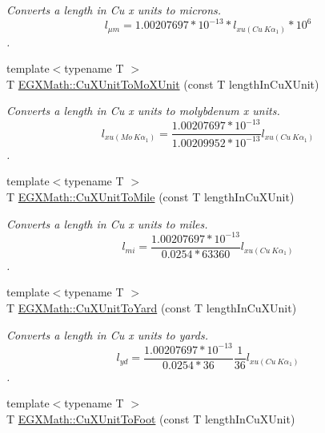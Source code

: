 \begin{DoxyCompactItemize}
\begin{DoxyCompactList}\small\item\em Converts a length in Cu x units to microns. \[ l_{\mu m}=1.00207697*10^{-13} * l_{xu(Cu\ K\alpha_1)} * 10^{6} \]. \end{DoxyCompactList}\item 
{\footnotesize template$<$typename T $>$ }\\T \mbox{\hyperlink{group___e_g_x_math-_conversions-_length_conversions-_non-_s_i-_cu_x_unit-_non-_s_i_gad93f4b59cc8e8f052b3cf8cad7c7b173}{E\+G\+X\+Math\+::\+Cu\+X\+Unit\+To\+Mo\+X\+Unit}} (const T length\+In\+Cu\+X\+Unit)
\begin{DoxyCompactList}\small\item\em Converts a length in Cu x units to molybdenum x units. \[ l_{xu(Mo\ K\alpha_1)}=\frac{1.00207697*10^{-13}}{1.00209952*10^{-13}} l_{xu(Cu\ K\alpha_1)}\]. \end{DoxyCompactList}\item 
{\footnotesize template$<$typename T $>$ }\\T \mbox{\hyperlink{group___e_g_x_math-_conversions-_length_conversions-_non-_s_i-_cu_x_unit-_imperial_gaa1fe76010dc4559641c3bd31bd0f2c3e}{E\+G\+X\+Math\+::\+Cu\+X\+Unit\+To\+Mile}} (const T length\+In\+Cu\+X\+Unit)
\begin{DoxyCompactList}\small\item\em Converts a length in Cu x units to miles. \[ l_{mi}=\frac{1.00207697*10^{-13}}{0.0254 * 63360} l_{xu(Cu\ K\alpha_1)} \]. \end{DoxyCompactList}\item 
{\footnotesize template$<$typename T $>$ }\\T \mbox{\hyperlink{group___e_g_x_math-_conversions-_length_conversions-_non-_s_i-_cu_x_unit-_imperial_ga9f1d992d0b4ec16bf1d10bd0b0d96f96}{E\+G\+X\+Math\+::\+Cu\+X\+Unit\+To\+Yard}} (const T length\+In\+Cu\+X\+Unit)
\begin{DoxyCompactList}\small\item\em Converts a length in Cu x units to yards. \[ l_{yd}= \frac{1.00207697*10^{-13}}{0.0254 * 36} \frac{1}{36} l_{xu(Cu\ K\alpha_1)} \]. \end{DoxyCompactList}\item 
{\footnotesize template$<$typename T $>$ }\\T \mbox{\hyperlink{group___e_g_x_math-_conversions-_length_conversions-_non-_s_i-_cu_x_unit-_imperial_ga715aad2504073f62b0afd0e492d97f2a}{E\+G\+X\+Math\+::\+Cu\+X\+Unit\+To\+Foot}} (const T length\+In\+Cu\+X\+Unit)

\end{DoxyCompactItemize}
